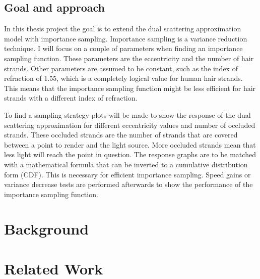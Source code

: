 \documentclass[11pt,a4paper]{report}
\begin{document}
\section{Goal and approach}
In this thesis project the goal is to extend the dual scattering approximation model with importance sampling. Importance sampling is a variance reduction technique. I will focus on a couple of parameters when finding an importance sampling function. These parameters are the eccentricity and the number of hair strands. Other parameters are assumed to be constant, such as the index of refraction of 1.55, which is a completely logical value for human hair strands. This means that the importance sampling function might be less efficient for hair strands with a different index of refraction.

To find a sampling strategy plots will be made to show the response of the dual scattering approximation for different eccentricity values and number of occluded strands. These occluded strands are the number of strands that are covered between a point to render and the light source. More occluded strands mean that less light will reach the point in question. The response graphs are to be matched with a mathematical formula that can be inverted to a cumulative distribution form (CDF). This is necessary for efficient importance sampling. Speed gains or variance decrease tests are performed afterwards to show the performance of the importance sampling function.



%
%

\chapter{Background}


\chapter{Related Work}

\end{document}
